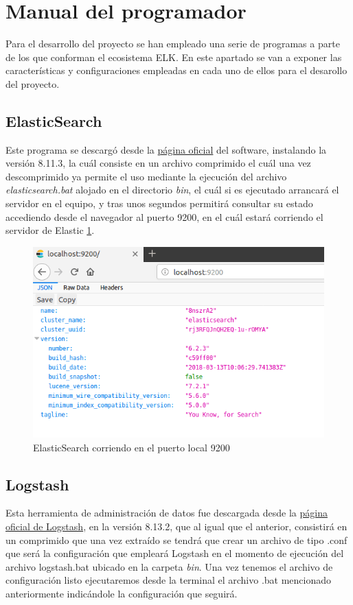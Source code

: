 \section{Manual del programador}
Para el desarrollo del proyecto se han empleado una serie de programas a parte de los que conforman el ecosistema ELK. En este apartado se van a exponer las características y configuraciones empleadas en cada uno de ellos para el desarollo del proyecto.

\subsection{ElasticSearch}
Este programa se descargó desde la \href{https://www.elastic.co/es/elasticsearch}{página oficial} del software, instalando la versión 8.11.3, la cuál consiste en un archivo comprimido el cuál una vez descomprimido ya permite el uso mediante la ejecución del archivo \textit{elasticsearch.bat} alojado en el directorio \textit{bin}, el cuál si es ejecutado arrancará el servidor en el equipo, y tras unos segundos permitirá consultar su estado accediendo desde el navegador al puerto 9200, en el cuál estará corriendo el servidor de Elastic \ref{fig:elastic9200}.

\begin{figure}
    \centering
    \includegraphics[width=1\linewidth]{img/elastic.png}
    \caption{ElasticSearch corriendo en el puerto local 9200}
    \label{fig:elastic9200}
\end{figure}

\subsection{Logstash}
Esta herramienta de administración de datos fue descargada desde la \href{https://www.elastic.co/es/logstash}{página oficial de Logstash}, en la versión 8.13.2, que al igual que el anterior, consistirá en un comprimido que una vez extraído se tendrá que crear un archivo de tipo .conf que será la configuración que empleará Logstash en el momento de ejecución del archivo logstash.bat ubicado en la carpeta \textit{bin}. Una vez tenemos el archivo de configuración listo ejecutaremos desde la terminal el archivo .bat mencionado anteriormente indicándole la configuración que seguirá.

